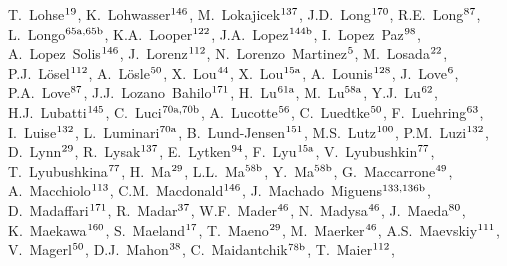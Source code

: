 \begin{flushleft}
T.~Lohse$^\textrm{\scriptsize 19}$,    
K.~Lohwasser$^\textrm{\scriptsize 146}$,    
M.~Lokajicek$^\textrm{\scriptsize 137}$,    
J.D.~Long$^\textrm{\scriptsize 170}$,    
R.E.~Long$^\textrm{\scriptsize 87}$,    
L.~Longo$^\textrm{\scriptsize 65a,65b}$,    
K.A.~Looper$^\textrm{\scriptsize 122}$,    
J.A.~Lopez$^\textrm{\scriptsize 144b}$,    
I.~Lopez~Paz$^\textrm{\scriptsize 98}$,    
A.~Lopez~Solis$^\textrm{\scriptsize 146}$,    
J.~Lorenz$^\textrm{\scriptsize 112}$,    
N.~Lorenzo~Martinez$^\textrm{\scriptsize 5}$,    
M.~Losada$^\textrm{\scriptsize 22}$,    
P.J.~L{\"o}sel$^\textrm{\scriptsize 112}$,    
A.~L\"osle$^\textrm{\scriptsize 50}$,    
X.~Lou$^\textrm{\scriptsize 44}$,    
X.~Lou$^\textrm{\scriptsize 15a}$,    
A.~Lounis$^\textrm{\scriptsize 128}$,    
J.~Love$^\textrm{\scriptsize 6}$,    
P.A.~Love$^\textrm{\scriptsize 87}$,    
J.J.~Lozano~Bahilo$^\textrm{\scriptsize 171}$,    
H.~Lu$^\textrm{\scriptsize 61a}$,    
M.~Lu$^\textrm{\scriptsize 58a}$,    
Y.J.~Lu$^\textrm{\scriptsize 62}$,    
H.J.~Lubatti$^\textrm{\scriptsize 145}$,    
C.~Luci$^\textrm{\scriptsize 70a,70b}$,    
A.~Lucotte$^\textrm{\scriptsize 56}$,    
C.~Luedtke$^\textrm{\scriptsize 50}$,    
F.~Luehring$^\textrm{\scriptsize 63}$,    
I.~Luise$^\textrm{\scriptsize 132}$,    
L.~Luminari$^\textrm{\scriptsize 70a}$,    
B.~Lund-Jensen$^\textrm{\scriptsize 151}$,    
M.S.~Lutz$^\textrm{\scriptsize 100}$,    
P.M.~Luzi$^\textrm{\scriptsize 132}$,    
D.~Lynn$^\textrm{\scriptsize 29}$,    
R.~Lysak$^\textrm{\scriptsize 137}$,    
E.~Lytken$^\textrm{\scriptsize 94}$,    
F.~Lyu$^\textrm{\scriptsize 15a}$,    
V.~Lyubushkin$^\textrm{\scriptsize 77}$,    
T.~Lyubushkina$^\textrm{\scriptsize 77}$,    
H.~Ma$^\textrm{\scriptsize 29}$,    
L.L.~Ma$^\textrm{\scriptsize 58b}$,    
Y.~Ma$^\textrm{\scriptsize 58b}$,    
G.~Maccarrone$^\textrm{\scriptsize 49}$,    
A.~Macchiolo$^\textrm{\scriptsize 113}$,    
C.M.~Macdonald$^\textrm{\scriptsize 146}$,    
J.~Machado~Miguens$^\textrm{\scriptsize 133,136b}$,    
D.~Madaffari$^\textrm{\scriptsize 171}$,    
R.~Madar$^\textrm{\scriptsize 37}$,    
W.F.~Mader$^\textrm{\scriptsize 46}$,    
N.~Madysa$^\textrm{\scriptsize 46}$,    
J.~Maeda$^\textrm{\scriptsize 80}$,    
K.~Maekawa$^\textrm{\scriptsize 160}$,    
S.~Maeland$^\textrm{\scriptsize 17}$,    
T.~Maeno$^\textrm{\scriptsize 29}$,    
M.~Maerker$^\textrm{\scriptsize 46}$,    
A.S.~Maevskiy$^\textrm{\scriptsize 111}$,    
V.~Magerl$^\textrm{\scriptsize 50}$,    
D.J.~Mahon$^\textrm{\scriptsize 38}$,    
C.~Maidantchik$^\textrm{\scriptsize 78b}$,    
T.~Maier$^\textrm{\scriptsize 112}$,    

\end{flushleft}
